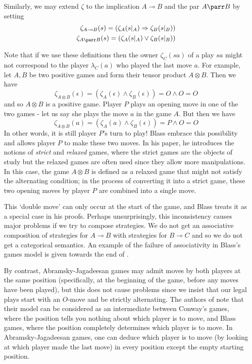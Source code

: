\documentclass[11pt]{article} %
\theoremstyle{plain} %
\theoremstyle{definition} %
\theoremstyle{note}
\theoremstyle{exercisestyle}
\newcommand{\tensor}{\otimes}
\renewcommand{\implies}{\multimap}
\newcommand{\emptyplay}{\epsilon}
\begin{document}
Similarly, we may extend $\zeta$ to the implication $A\implies B$ and the par $A\parr B$ by setting
\begin{align*}
  \zeta_{A\implies B}(s)=(\zeta_A(s\vert_A)\Rightarrow \zeta_B(s\vert_B))\\
  \zeta_{A\parr B}(s) = (\zeta_A(s\vert_A) \vee \zeta_B(s\vert_B))
\end{align*}

Note that if we use these definitions then the owner $\zeta_C(sa)$ of a play $sa$ might not correspond to the player $\lambda_C(a)$ who played the last move $a$.  For example, let $A,B$ be two positive games and form their tensor product $A\tensor B$.  Then we have
\[
  \zeta_{A\tensor B}(\emptyplay) = (\zeta_A(\emptyplay) \wedge \zeta_B(\emptyplay)) = O \wedge O = O
  \]
and so $A\tensor B$ is a positive game.  Player $P$ plays an opening move in one of the two games - let us say she plays the move $a$ in the game $A$.  But then we have
\[
  \zeta_{A\tensor B}(a) = (\zeta_A(a) \wedge \zeta_B(\emptyplay)) = P \wedge O = O
  \]
In other words, it is still player $P$'s turn to play!  Blass embrace this possibility and allows player $P$ to make these two moves.  In his paper, he introduces the notions of \emph{strict} and \emph{relaxed} games, where the strict games are the objects of study but the relaxed games are often used since they allow more manipulations.  In this case, the game $A\tensor B$ is defined as a relaxed game that might not satisfy the alternating condition; in the process of converting it into a strict game, these two opening moves by player $P$ are combined into a single move.

This `double move' can only occur at the start of the game, and Blass treats it as a special case in his proofs.  Perhaps unsurprisingly, this inconsistency causes major problems if we try to compose strategies.  We do not get an associative composition of strategies for $A\implies B$ with strategies for $B\implies C$ and so we do not get a categorical semantics.  An example of the failure of associativity in Blass's games model is given towards the end of \cite{abramskyjagadeesangames}.

By contrast, Abramsky-Jagadeesan games may admit moves by both players at the same position (specifically, at the beginning of the game, before any moves have been played), but this does not cause problems since we insist that our legal plays start with an $O$-move and be strictly alternating.  The authors of \cite{abramskyjagadeesangames} note that their model can be considered as an intermediate between Conway's games, where the position tells you nothing about which player is to move, and Blass games, where the position completely determines which player is to move.  In Abramsky-Jagadeesan games, one can deduce which player is to move (by looking at which player made the last move) in every position except the empty starting position.
\end{document}
